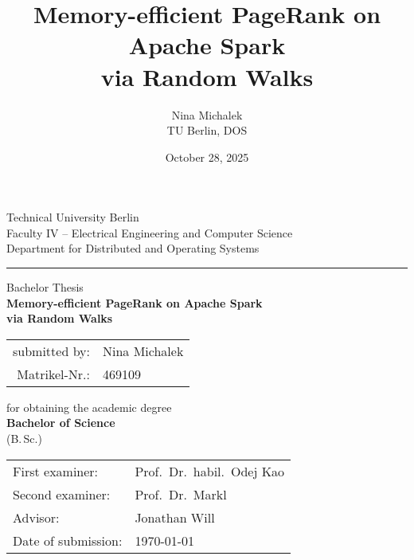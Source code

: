 \documentclass[a4paper,12pt]{article}
\title{Memory-efficient PageRank on Apache Spark\\ via Random Walks}
\author{Nina Michalek \\ TU Berlin, DOS}
\date{October 28, 2025}
\begin{document}
\begin{titlepage}
\setlength{\parindent}{0pt}
\vspace{8mm}
{\raggedright
Technical University Berlin\\
Faculty IV -- Electrical Engineering and Computer Science\\
Department for Distributed and Operating Systems\par
}
\vspace{8mm}
\hrule   %
\vspace{10mm}
\vspace{15mm}
\begin{center}
\Large Bachelor Thesis\\[15mm]
\Huge \textbf{Memory-efficient PageRank on Apache Spark\\ via Random Walks}
\end{center}
\vspace{10mm}
\begin{center}
\begin{tabular}{rl}
submitted by: & Nina Michalek \\
Matrikel-Nr.: & 469109 \\
\end{tabular}
\end{center}
\vspace{8mm}
\begin{center}
\onehalfspacing
for obtaining the academic degree \\
\large \textbf{Bachelor of Science} \\
\normalsize (B.\,Sc.)
\end{center}
\vfill
\onehalfspacing
\begin{tabular}{@{}ll}
First examiner: & Prof.\ Dr.\ habil.\ Odej Kao\\
Second examiner: & Prof.\ Dr.\ Markl \\
Advisor: & Jonathan Will\\
Date of submission: & \today
\end{tabular}
\end{titlepage}
\tableofcontents
\newpage
\vspace*{4ex}  %

\newpage
\vspace*{4ex}  %

\newpage
\vspace*{4ex}  %

\newpage
\vspace*{4ex}  %

\newpage
\vspace*{4ex}  %

\newpage
\vspace*{4ex}  %

\newpage

\end{document}
